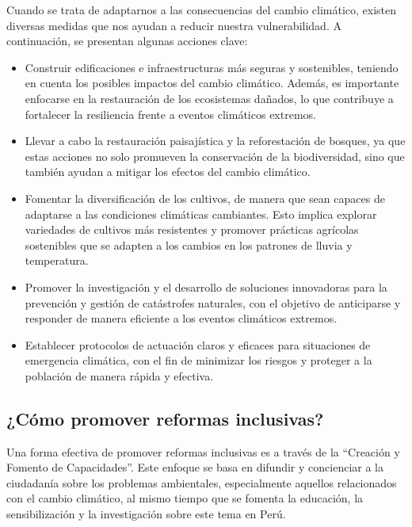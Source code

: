 \documentclass[
  a4paper,
]{article}
\providecommand{\tightlist}{%
  \setlength{\itemsep}{0pt}\setlength{\parskip}{0pt}}\usepackage{longtable,booktabs,array}
\begin{document}
Cuando se trata de adaptarnos a las consecuencias del cambio climático,
existen diversas medidas que nos ayudan a reducir nuestra
vulnerabilidad. A continuación, se presentan algunas acciones clave:

\begin{itemize}
\tightlist
\item
  Construir edificaciones e infraestructuras más seguras y sostenibles,
  teniendo en cuenta los posibles impactos del cambio climático. Además,
  es importante enfocarse en la restauración de los ecosistemas dañados,
  lo que contribuye a fortalecer la resiliencia frente a eventos
  climáticos extremos.
\item
  Llevar a cabo la restauración paisajística y la reforestación de
  bosques, ya que estas acciones no solo promueven la conservación de la
  biodiversidad, sino que también ayudan a mitigar los efectos del
  cambio climático.
\item
  Fomentar la diversificación de los cultivos, de manera que sean
  capaces de adaptarse a las condiciones climáticas cambiantes. Esto
  implica explorar variedades de cultivos más resistentes y promover
  prácticas agrícolas sostenibles que se adapten a los cambios en los
  patrones de lluvia y temperatura.
\item
  Promover la investigación y el desarrollo de soluciones innovadoras
  para la prevención y gestión de catástrofes naturales, con el objetivo
  de anticiparse y responder de manera eficiente a los eventos
  climáticos extremos.
\item
  Establecer protocolos de actuación claros y eficaces para situaciones
  de emergencia climática, con el fin de minimizar los riesgos y
  proteger a la población de manera rápida y efectiva.
\end{itemize}

\hypertarget{cuxf3mo-promover-reformas-inclusivas}{%
\subsection{¿Cómo promover reformas
inclusivas?}\label{cuxf3mo-promover-reformas-inclusivas}}

Una forma efectiva de promover reformas inclusivas es a través de la
``Creación y Fomento de Capacidades''. Este enfoque se basa en difundir
y concienciar a la ciudadanía sobre los problemas ambientales,
especialmente aquellos relacionados con el cambio climático, al mismo
tiempo que se fomenta la educación, la sensibilización y la
investigación sobre este tema en Perú.
\end{document}
